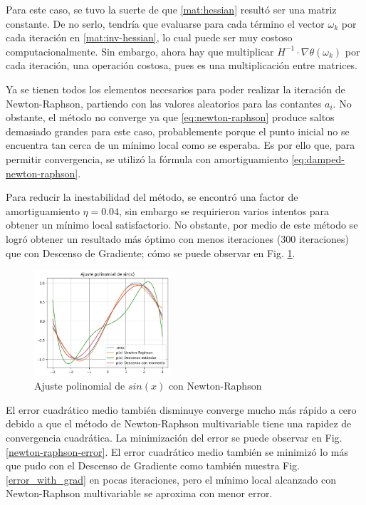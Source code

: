 \documentclass[conference]{IEEEtran}
\begin{document}
Para este caso, se tuvo la suerte de que \eqref{mat:hessian} resultó ser una matriz constante. De no serlo, tendría que evaluarse para cada término el vector $\omega_{k}$ por cada iteración en \eqref{mat:inv-hessian}, lo cual puede ser muy costoso computacionalmente. Sin embargo, ahora hay que multiplicar $H^{-1}\cdot\nabla\theta(\omega_{k})$ por cada iteración, una operación costosa, pues es una multiplicación entre matrices.

Ya se tienen todos los elementos necesarios para poder realizar la iteración de Newton-Raphson, partiendo con las valores aleatorios para las contantes $a_i$. No obstante, el método no converge ya que \eqref{eq:newton-raphson} produce saltos demasiado grandes para este caso, probablemente porque el punto inicial no se encuentra tan cerca de un mínimo local como se esperaba. Es por ello que, para permitir convergencia, se utilizó la fórmula con amortiguamiento \eqref{eq:damped-newton-raphson}.

Para reducir la inestabilidad del método, se encontró una factor de amortiguamiento $\eta=0.04$, sin embargo se requirieron varios intentos para obtener un mínimo local satisfactorio. No obstante, por medio de este método se logró obtener un resultado más óptimo con menos iteraciones (300 iteraciones) que con Descenso de Gradiente; cómo se puede observar en Fig. \ref{newton-raphson-plot}.

\begin{figure}[htbp]
\centerline{\includegraphics[width=0.45\textwidth]{fig3.png}}
\caption{Ajuste polinomial de $sin(x)$ con Newton-Raphson}
\label{newton-raphson-plot}
\end{figure}

El error cuadrático medio también disminuye converge mucho más rápido a cero debido a que el método de Newton-Raphson multivariable tiene una rapidez de convergencia cuadrática. La minimización del error se puede observar en Fig. \ref{newton-raphson-error}. El error cuadrático medio también se minimizó lo más que pudo con el Descenso de Gradiente como también muestra Fig. \ref{error_with_grad} en pocas iteraciones, pero el mínimo local alcanzado con Newton-Raphson multivariable se aproxima con menor error.
\end{document}
